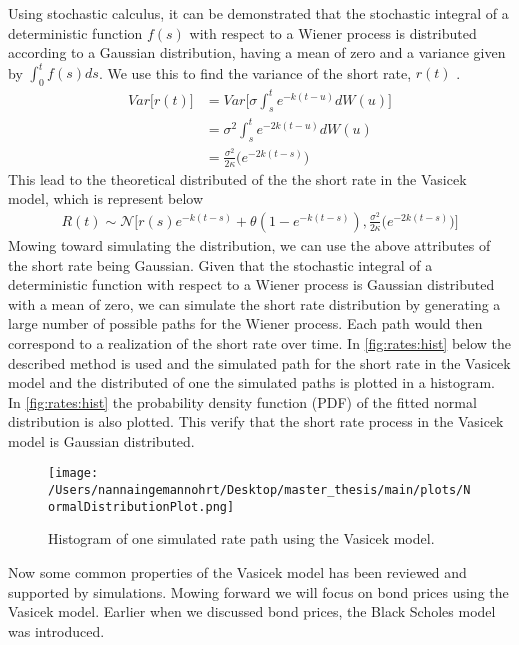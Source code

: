 Using stochastic calculus, it can be demonstrated that the stochastic integral of a deterministic function 
$f(s)$ with respect to a Wiener process is distributed according to a Gaussian distribution,
having a mean of zero and a variance given by $\int_0^t f(s) ds$. We use this to find the variance of the short rate,
$r(t)$ \cite{Bjork}.
\begin{align*}
    Var\Big[r(t)\Big] &= Var\Big[\sigma \int_{s}^{t}e^{-k(t-u)} d W(u) \Big] \\
    &= \sigma^2 \int_{s}^{t}e^{-2k(t-u)} d W(u) \\
    &= \frac{\sigma^2}{2\kappa} \Big(e^{-2k(t-s)}\Big)
    \end{align*}
This lead to the theoretical distributed of the the short rate in the Vasicek model, which is represent below
\begin{align}
    R(t) \sim \mathcal{N} \Big[ r(s) e^{-k(t-s)} + \theta \left( 1 - e^{-k(t-s)} \right) ,
    \frac{\sigma^2}{2\kappa} \Big(e^{-2k(t-s)}\Big) \Big]
\end{align}
Mowing toward simulating the distribution, we can use the above attributes of the short rate being Gaussian.
Given that the stochastic integral of a deterministic function with respect to a Wiener process is Gaussian distributed
with a mean of zero, we can simulate the short rate distribution by generating a large number of possible paths
for the Wiener process. Each path would then correspond to a realization of the short rate over time. In \autoref{fig:rates:hist}
below the described method is used and the simulated path for the short rate in the Vasicek model and the distributed of one  the
simulated paths is plotted in a histogram. In \autoref{fig:rates:hist} the probability density function (PDF) of the 
fitted normal distribution is also plotted. This verify that the short rate process in the Vasicek model is Gaussian distributed.
\begin{figure}[H]
    \centering
    \texttt{[image: /Users/nannaingemannohrt/Desktop/master\_thesis/main/plots/NormalDistributionPlot.png]}
    \caption{Histogram of one simulated rate path using the Vasicek model.}
    \label{fig:rates:hist}
\end{figure}
\noindent
Now some common properties of the Vasicek model has been reviewed and supported by simulations. Mowing forward we will 
focus on bond prices using the Vasicek model. Earlier when we discussed bond prices, the Black Scholes model was introduced. 
\\\\
